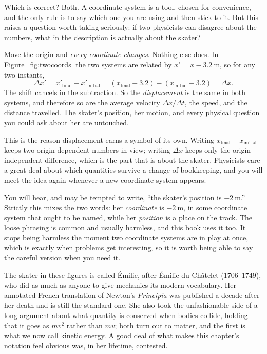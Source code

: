 \documentclass[11pt,twoside,openany]{book}
\begin{document}
Which is correct? Both. A coordinate system is a tool, chosen for convenience, and the only rule is to say which one you are using and then stick to it. But this raises a question worth taking seriously: if two physicists can disagree about the numbers, what in the description is actually about the skater?

\begin{keyidea}
Move the origin and \emph{every coordinate changes}. Nothing else does. In Figure~\ref{fig:twocoords} the two systems are related by $x' = x - \SI{3.2}{\metre}$, so for any two instants,
\[
\Delta x' = x'_{\text{final}} - x'_{\text{initial}} = (x_{\text{final}} - 3.2) - (x_{\text{initial}} - 3.2) = \Delta x .
\]
The shift cancels in the subtraction. So the \emph{displacement} is the same in both systems, and therefore so are the average velocity $\Delta x/\Delta t$, the speed, and the distance travelled. The skater's position, her motion, and every physical question you could ask about her are untouched.
\end{keyidea}

This is the reason displacement earns a symbol of its own. Writing $x_{\text{final}} - x_{\text{initial}}$ keeps two origin-dependent numbers in view; writing $\Delta x$ keeps only the origin-independent difference, which is the part that is about the skater. Physicists care a great deal about which quantities survive a change of bookkeeping, and you will meet the idea again whenever a new coordinate system appears.

\begin{modelnote}
You will hear, and may be tempted to write, ``the skater's position is $\SI{-2}{\metre}$.'' Strictly this mixes the two words: her \emph{coordinate} is $\SI{-2}{\metre}$, in some coordinate system that ought to be named, while her \emph{position} is a place on the track. The loose phrasing is common and usually harmless, and this book uses it too. It stops being harmless the moment two coordinate systems are in play at once, which is exactly when problems get interesting, so it is worth being able to say the careful version when you need it.
\end{modelnote}

\begin{modelnote}
The skater in these figures is called \'Emilie, after \'Emilie du Ch\^atelet (1706--1749), who did as much as anyone to give mechanics its modern vocabulary. Her annotated French translation of Newton's \emph{Principia} was published a decade after her death and is still the standard one. She also took the unfashionable side of a long argument about what quantity is conserved when bodies collide, holding that it goes as $mv^2$ rather than $mv$; both turn out to matter, and the first is what we now call kinetic energy. A good deal of what makes this chapter's notation feel obvious was, in her lifetime, contested.
\end{modelnote}
\end{document}
